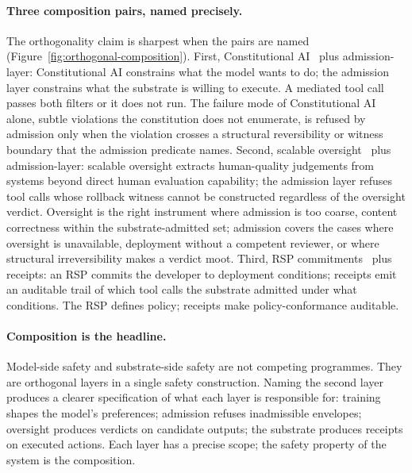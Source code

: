 \paragraph{Three composition pairs, named precisely.}
The orthogonality claim is sharpest when the pairs are named (Figure~\ref{fig:orthogonal-composition}). First, Constitutional AI~\cite{baiConstitutionalAI2022} plus admission-layer: Constitutional AI constrains what the model wants to do; the admission layer constrains what the substrate is willing to execute. A mediated tool call passes both filters or it does not run. The failure mode of Constitutional AI alone, subtle violations the constitution does not enumerate, is refused by admission only when the violation crosses a structural reversibility or witness boundary that the admission predicate names. Second, scalable oversight~\cite{leikeScalableOversight2018,christianoDebate2018,bowmanScalableOversight2022} plus admission-layer: scalable oversight extracts human-quality judgements from systems beyond direct human evaluation capability; the admission layer refuses tool calls whose rollback witness cannot be constructed regardless of the oversight verdict. Oversight is the right instrument where admission is too coarse, content correctness within the substrate-admitted set; admission covers the cases where oversight is unavailable, deployment without a competent reviewer, or where structural irreversibility makes a verdict moot. Third, RSP commitments~\cite{anthropicRSP2023} plus receipts: an RSP commits the developer to deployment conditions; receipts emit an auditable trail of which tool calls the substrate admitted under what conditions. The RSP defines policy; receipts make policy-conformance auditable.

\paragraph{Composition is the headline.}
Model-side safety and substrate-side safety are not competing programmes. They are orthogonal layers in a single safety construction. Naming the second layer produces a clearer specification of what each layer is responsible for: training shapes the model's preferences; admission refuses inadmissible envelopes; oversight produces verdicts on candidate outputs; the substrate produces receipts on executed actions. Each layer has a precise scope; the safety property of the system is the composition.
